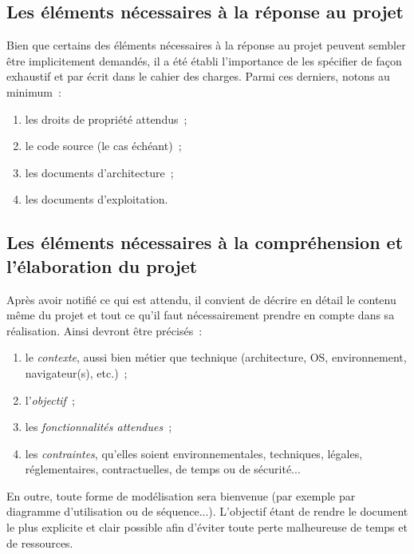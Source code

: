 \documentclass[11pt,fleqn]{report}
\begin{document}
\subsection{Les éléments nécessaires à la réponse au projet}
Bien que certains des éléments nécessaires à la réponse au projet peuvent sembler être implicitement demandés, il a été établi l'importance de les spécifier de façon exhaustif et par écrit dans le cahier des charges. Parmi ces derniers, notons au minimum~:
\begin{enumerate}
	\item les droits de propriété attendus~;
	\item le code source (le cas échéant)~;
	\item les documents d'architecture~;
	\item les documents d'exploitation.
\end{enumerate}

\subsection{Les éléments nécessaires à la compréhension et l'élaboration du projet}
Après avoir notifié ce qui est attendu, il convient de décrire en détail le contenu même du projet et tout ce qu'il faut nécessairement prendre en compte dans sa réalisation. Ainsi devront être précisés~:
\begin{enumerate}
	\item le \emph{contexte}, aussi bien métier que technique (architecture, OS, environnement, navigateur(s),  etc.)~;
	\item l'\emph{objectif}~;
	\item les \emph{fonctionnalités attendues}~;
	\item les \emph{contraintes}, qu'elles soient environnementales, techniques, légales, réglementaires, contractuelles, de temps ou de sécurité...
\end{enumerate}
En outre, toute forme de modélisation sera bienvenue (par exemple par diagramme d'utilisation ou de séquence...). L'objectif étant de rendre le document le plus explicite et clair possible afin d'éviter toute perte malheureuse de temps et de ressources.
\end{document}
